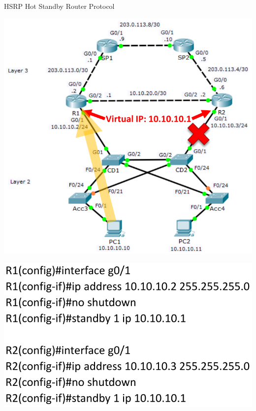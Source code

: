 \documentclass[pdflatex,compress,mathserif]{beamer}
\begin{document}
\begin{frame}{HSRP Hot Standby Router Protocol}
	\begin{multicols}{2}
		\begin{center}
			\includegraphics[width=\linewidth]{img/img12}
		\end{center}
		\columnbreak
		\begin{center}
			\includegraphics[width=\linewidth]{img/img13}
		\end{center}
	\end{multicols}
\end{frame}
\end{document}
